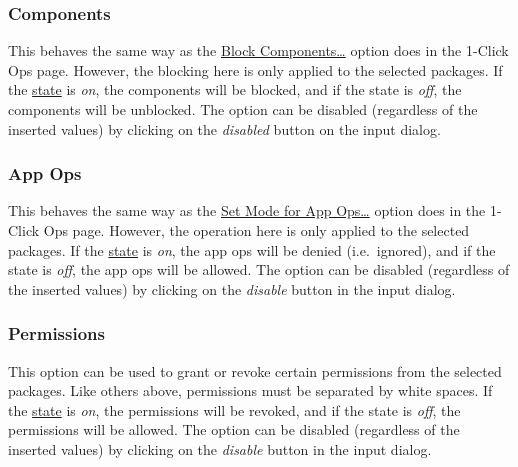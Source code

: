 \subsubsection{Components} %
This behaves the same way as the \hyperref[subsec:block-components-dots]{Block Components\dots} option does in the
1-Click Ops page. However, the blocking here is only applied to the selected packages.
If the \hyperref[subsubsec:profile-state]{state} is \textit{on}, the components will be blocked,
and if the state is \textit{off}, the components will be unblocked.
The option can be disabled (regardless of the inserted values) by clicking on the \textit{disabled} button on the input dialog.


\subsubsection{App Ops} %
This behaves the same way as the \hyperref[subsec:set-mode-for-app-ops-dots]{Set Mode for App Ops\dots} option does in
the 1-Click Ops page. However, the operation here is only applied to the selected packages.
If the \hyperref[subsubsec:profile-state]{state} is \textit{on}, the app ops will be denied (i.e.\ ignored),
and if the state is \textit{off}, the app ops will be allowed. The option can be disabled (regardless of the inserted
values) by clicking on the \textit{disable} button in the input dialog.

\subsubsection{Permissions} %
This option can be used to grant or revoke certain permissions from the selected packages. Like others above,
permissions must be separated by white spaces. If the \hyperref[subsubsec:profile-state]{state} is \textit{on}, the
permissions will be revoked, and if the state is \textit{off}, the permissions will be allowed. The option can be
disabled (regardless of the inserted values) by clicking on the \textit{disable} button in the input dialog.

